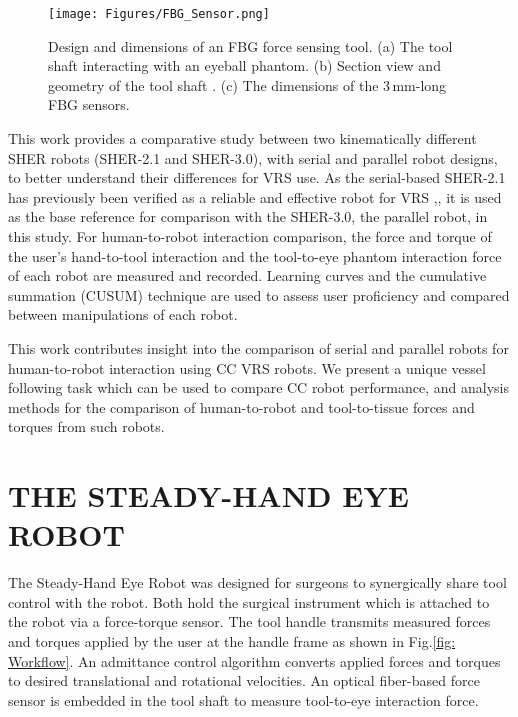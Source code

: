 \documentclass[letterpaper, 10 pt, conference]{ieeeconf}  %
\begin{document}
\begin{figure}[t!]
  \centering
    \texttt{[image: Figures/FBG\_Sensor.png]}
      \caption{Design and dimensions of an FBG force sensing tool. (a) The tool shaft interacting with an eyeball phantom. (b) Section view and geometry of the tool shaft \cite{he2020automatic}. (c) The dimensions of the 3\,mm-long FBG sensors.}
      \label{fig: FBG_sensor}
\end{figure}

This work provides a comparative study between two kinematically different SHER robots (SHER-2.1 and SHER-3.0), with serial and parallel robot designs, to better understand their differences for VRS use. As the serial-based SHER-2.1 has previously been verified as a reliable and effective robot for VRS \cite{he2012toward},\cite{ebrahimi2018real}, it is used as the base reference for comparison with the SHER-3.0, the parallel robot, in this study. For human-to-robot interaction comparison, the force and torque of the user's hand-to-tool interaction and the tool-to-eye phantom interaction force of each robot are measured and recorded. Learning curves and the cumulative summation (CUSUM) technique \cite{nagakawa2018learning} are used to assess user proficiency and compared between manipulations of each robot.

This work contributes insight into the comparison of serial and parallel robots for human-to-robot interaction using CC VRS robots. We present a unique vessel following task which can be used to compare CC robot performance, and analysis methods for the comparison of human-to-robot and tool-to-tissue forces and torques from such robots.

\section{THE STEADY-HAND EYE ROBOT}

The Steady-Hand Eye Robot was designed for surgeons to synergically share tool control with the robot. Both hold the surgical instrument which is attached to the robot via a force-torque sensor. The tool handle transmits measured forces and torques applied by the user at the handle frame as shown in Fig.\ref{fig: Workflow}. An admittance control algorithm converts applied forces and torques to desired translational and rotational velocities. An optical fiber-based force sensor is embedded in the tool shaft to measure tool-to-eye interaction force.
\end{document}
